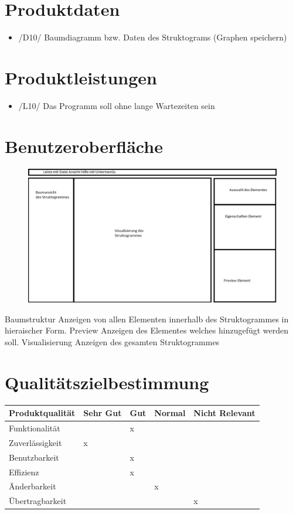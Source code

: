 \documentclass[a4paper,10pt]{report}
\begin{document}
\section{Produktdaten}
\begin{itemize}
\item /D10/ Baumdiagramm bzw. Daten des Struktograms (Graphen speichern)
\end{itemize}
\section{Produktleistungen}
\begin{itemize}
\item /L10/ Das Programm soll ohne lange Wartezeiten sein
\end{itemize}
\section{Benutzeroberfläche}
\begin{figure}[h!]
  \caption{}
  \centering
    \includegraphics[width=1.3\textwidth]{gui-skizze.png}
\end{figure}
Baumstruktur Anzeigen von allen Elementen innerhalb des Struktogrammes in hieraischer Form.
Preview Anzeigen des Elementes welches hinzugefügt werden soll.
Visualisierung Anzeigen des gesamten Struktogrammes

\section{Qualitätszielbestimmung}

\begin{center}
  \begin{tabular}{| l | l | l | l | l |}
    \hline
   	 Produktqualität & Sehr Gut & Gut  & Normal & Nicht Relevant \\ \hline
    	 Funktionalität &   &  x &  & \\ \hline
 	 Zuverlässigkeit & x  &   &  & \\ \hline
 	Benutzbarkeit &   &  x &  & \\ \hline
      	 Effizienz &   &  x &  & \\ \hline
      	 Änderbarkeit &   &  &  x & \\ \hline
      	Übertragbarkeit &   &   &  & x \\ \hline
  \end{tabular}
\end{center}
\end{document}
